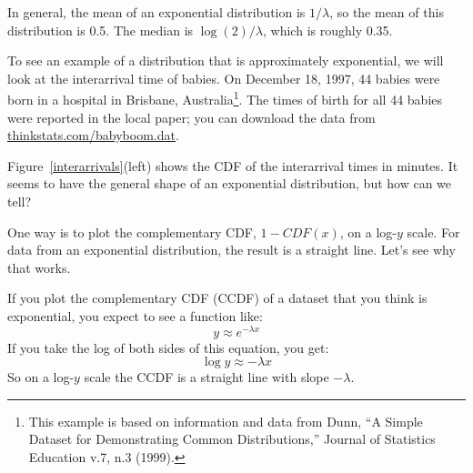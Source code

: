 \documentclass[12pt]{book}
\begin{document}
In general, the mean of an exponential distribution is $1 / \lambda$,
so the mean of this distribution is 0.5.  The median is $\log(2) / \lambda$,
which is roughly 0.35.


To see an example of a distribution that is approximately exponential,
we will look at the interarrival time of babies.
On December 18, 1997, 44 babies were born in a hospital in Brisbane,
Australia\footnote{This example is based on information and data from
  Dunn, ``A Simple Dataset for Demonstrating Common Distributions,''
  Journal of Statistics Education v.7, n.3 (1999).}.  The times of
birth for all 44 babies were reported in the local paper; you can
download the data from \url{thinkstats.com/babyboom.dat}.


Figure~\ref{interarrivals}(left) shows the CDF of the interarrival times
in minutes.  It seems to have the general shape of an exponential
distribution, but how can we tell?


One way is to plot the complementary CDF, $1 - CDF(x)$, on a
log-$y$ scale.  For data from an exponential distribution, the result
is a straight line.  Let's see why that works.

If you plot the complementary CDF (CCDF) of a dataset that you think is
exponential, you expect to see a function like:
%
\[ y \approx e^{-\lambda x} \]
%
If you take the log of both sides of this equation, you get:
%
\[ \log y \approx -\lambda x \]
%
So on a log-$y$ scale the CCDF is a straight line
with slope $-\lambda$.

\end{document}
